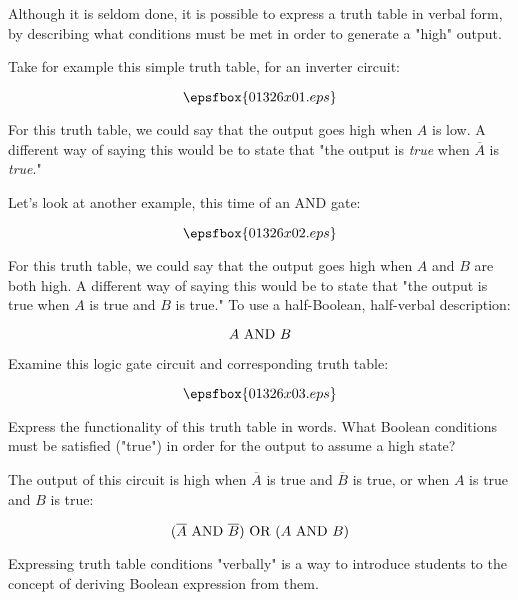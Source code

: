 

Although it is seldom done, it is possible to express a truth table in verbal form, by describing what conditions must be met in order to generate a "high" output.

Take for example this simple truth table, for an inverter circuit:

$$\epsfbox{01326x01.eps}$$

For this truth table, we could say that the output goes high when $A$ is low.  A different way of saying this would be to state that "the output is {\it true} when $\overline{A}$ is {\it true}."

\vskip 10pt

Let's look at another example, this time of an AND gate:

$$\epsfbox{01326x02.eps}$$

For this truth table, we could say that the output goes high when $A$ and $B$ are both high.  A different way of saying this would be to state that "the output is true when $A$ is true and $B$ is true."  To use a half-Boolean, half-verbal description:

$$A \hbox{ AND } B$$

\vskip 10pt

Examine this logic gate circuit and corresponding truth table:

$$\epsfbox{01326x03.eps}$$

Express the functionality of this truth table in words.  What Boolean conditions must be satisfied ("true") in order for the output to assume a high state?







The output of this circuit is high when $\overline{A}$ is true and $\overline{B}$ is true, or when $A$ is true and $B$ is true:

$$(\overline{A} \hbox{ AND } \overline{B}) \hbox{ OR } (A \hbox{ AND } B)$$







Expressing truth table conditions "verbally" is a way to introduce students to the concept of deriving Boolean expression from them.




